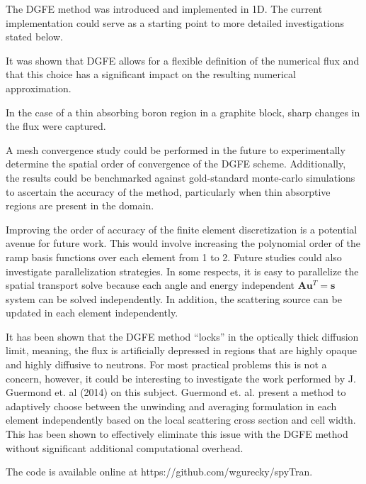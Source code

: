 
The DGFE method was introduced and implemented in 1D.   The current implementation could serve as a starting point to more detailed investigations stated below.

It was shown that DGFE allows for a flexible definition of the numerical flux and that this choice has a significant impact on the resulting numerical approximation.

In the case of a thin absorbing boron region in a graphite block, sharp changes in the flux were captured.

A mesh convergence study could be performed in the future to experimentally determine the spatial order of convergence of the DGFE scheme.  Additionally, the results could be benchmarked against gold-standard monte-carlo simulations to ascertain the accuracy of the method, particularly when thin absorptive regions are present in the domain.

Improving the order of accuracy of the finite element discretization is a potential avenue for future work. This would involve increasing the polynomial order of the ramp basis functions over each element from 1 to 2. Future studies could also investigate parallelization strategies. In some respects, it is easy to parallelize the spatial transport solve because each angle and energy independent $\mathbf A \mathbf u^T = \mathbf s$ system can be solved independently. In addition, the scattering source can be updated in each element independently.

It has been shown that the DGFE method ``locks'' in the optically thick diffusion limit, meaning, the flux is artificially depressed in regions that are highly opaque and highly diffusive to neutrons.  For most practical problems this is not a concern, however, it could be interesting to investigate the work performed by J. Guermond et. al (2014) \cite{Guermond2014} on this subject.  Guermond et. al. present a method to adaptively choose between the unwinding and averaging formulation in each element independently based on the local scattering cross section and cell width.  This has been shown to effectively eliminate this issue with the DGFE method without significant additional computational overhead.

The code is available online at https://github.com/wgurecky/spyTran.